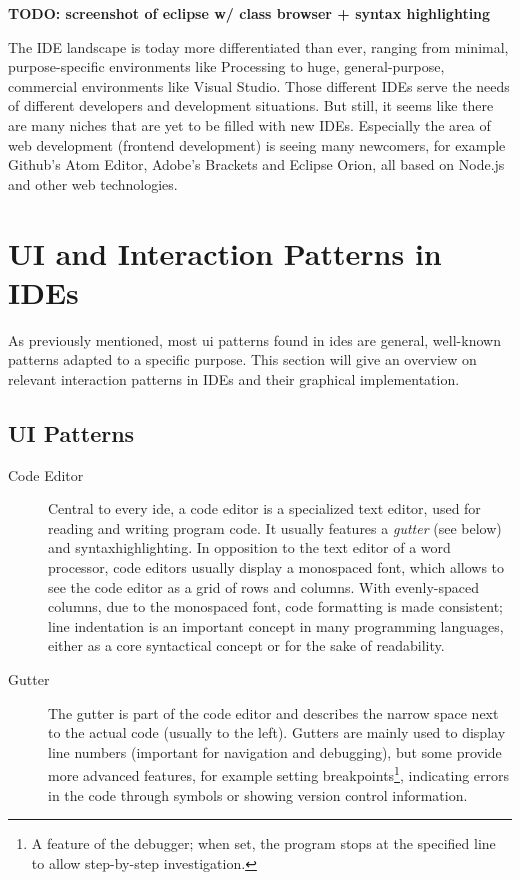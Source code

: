 \textbf{TODO: screenshot of eclipse w/ class browser + syntax
highlighting}

The IDE landscape is today more differentiated than ever, ranging from
minimal, purpose-specific environments like Processing to huge,
general-purpose, commercial environments like Visual Studio. Those
different IDEs serve the needs of different developers and development
situations. But still, it seems like there are many niches that are yet
to be filled with new IDEs. Especially the area of web development
(frontend development) is seeing many newcomers, for example Github’s
Atom Editor, Adobe’s Brackets and Eclipse Orion, all based on Node.js
and other web technologies.

\section{UI and Interaction Patterns in
IDEs}\label{ui-and-interaction-patterns-in-ides}

As previously mentioned, most \gls{ui} patterns found in \glspl{ide} are
general, well-known patterns adapted to a specific purpose. This section
will give an overview on relevant interaction patterns in IDEs and their
graphical implementation.

\subsection{UI Patterns}\label{ui-patterns}

\begin{description}
\item[Code Editor]
Central to every \gls{ide}, a code editor is a specialized text editor,
used for reading and writing program code. It usually features a
\emph{gutter} (see below) and \gls{syntaxhighlighting}. In opposition to
the text editor of a word processor, code editors usually display a
monospaced font, which allows to see the code editor as a grid of rows
and columns. With evenly-spaced columns, due to the monospaced font,
code formatting is made consistent; line indentation is an important
concept in many programming languages, either as a core syntactical
concept or for the sake of readability.
\item[Gutter]
The gutter is part of the code editor and describes the narrow space
next to the actual code (usually to the left). Gutters are mainly used
to display line numbers (important for navigation and debugging), but
some provide more advanced features, for example setting
breakpoints\footnote{A feature of the debugger; when set, the program stops at the specified line to allow step-by-step investigation.},
indicating errors in the code through symbols or showing version control
information.
\end{description}

